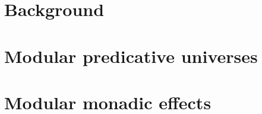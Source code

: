
\chapter{Background}







\chapter{Modular predicative universes}









\chapter{Modular monadic effects}







